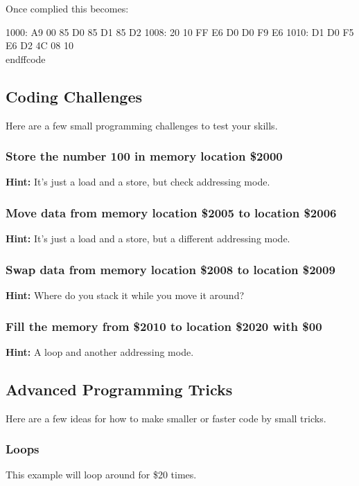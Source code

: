 \documentclass{ol-softwaremanual}
\begin{document}
Once complied this becomes:
\begin{ffcode}
1000: A9 00 85 D0 85 D1 85 D2
1008: 20 10 FF E6 D0 D0 F9 E6
1010: D1 D0 F5 E6 D2 4C 08 10
\\end{ffcode}


\pagebreak

\subsection{Coding Challenges}
Here are a few small programming challenges to test your skills.

\subsubsection{Store the number 100 in memory location \$2000}
\textbf{Hint:} It's just a load and a store, but check addressing mode. 

\subsubsection{Move data from memory location \$2005 to location \$2006}
\textbf{Hint:} It's just a load and a store, but a different addressing mode.

\subsubsection{Swap data from memory location \$2008 to location \$2009}
\textbf{Hint:} Where do you stack it while you move it around?

\subsubsection{Fill the memory from \$2010 to location \$2020 with \$00}
\textbf{Hint:} A loop and another addressing mode.

\pagebreak

\subsection{Advanced Programming Tricks}
Here are a few ideas for how to make smaller or faster code by small tricks.\\

\subsubsection{Loops}
This example will loop around for \$20 times.


\end{ffcode}
\end{document}
